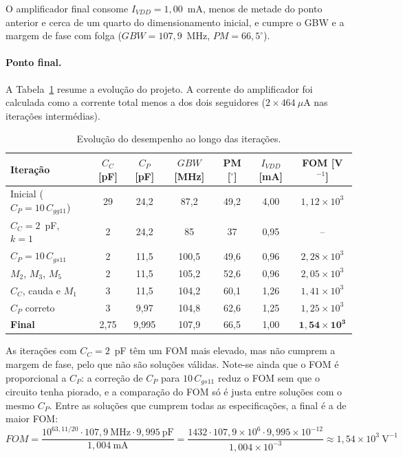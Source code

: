 O amplificador final consome $I_{VDD} = 1{,}00$~mA, menos de metade do ponto anterior e cerca de um quarto do
dimensionamento inicial, e cumpre o GBW e a margem de fase com folga ($GBW = 107{,}9$~MHz, $PM = 66{,}5^\circ$).

\paragraph{Ponto final.}
A Tabela~\ref{tab:iter_resumo} resume a evolução do projeto. A corrente do amplificador foi calculada como a corrente total
menos a dos dois seguidores ($2 \times 464~\mu$A nas iterações intermédias).

\begin{table}[H]
    \centering
    \caption{Evolução do desempenho ao longo das iterações.}
    \label{tab:iter_resumo}
    \small
    \begin{tabular}{lcccccc}
        \toprule
        Iteração & $C_C$ [pF] & $C_P$ [pF] & $GBW$ [MHz] & PM [$^\circ$] & $I_{VDD}$ [mA] & FOM [V$^{-1}$] \\
        \midrule
        Inicial ($C_P = 10\,C_{gg11}$)     & 29   & 24,2  & 87,2  & 49,2 & 4,00 & $1{,}12\times10^3$ \\
        $C_C = 2$~pF, $k = 1$              & 2    & 24,2  & 85    & 37   & 0,95 & -- \\
        $C_P = 10\,C_{gs11}$               & 2    & 11,5  & 100,5 & 49,6 & 0,96 & $2{,}28\times10^3$ \\
        $M_2$, $M_3$, $M_5$                & 2    & 11,5  & 105,2 & 52,6 & 0,96 & $2{,}05\times10^3$ \\
        $C_C$, cauda e $M_1$               & 3    & 11,5  & 104,2 & 60,1 & 1,26 & $1{,}41\times10^3$ \\
        $C_P$ correto                      & 3    & 9,97  & 104,8 & 62,6 & 1,25 & $1{,}25\times10^3$ \\
        \textbf{Final}                     & 2,75 & 9,995 & 107,9 & 66,5 & 1,00 & $\mathbf{1{,}54\times10^3}$ \\
        \bottomrule
    \end{tabular}
\end{table}

As iterações com $C_C = 2$~pF têm um FOM mais elevado, mas não cumprem a margem de fase, pelo que não são soluções
válidas. Note-se ainda que o FOM é proporcional a $C_P$: a correção de $C_P$ para $10\,C_{gs11}$ reduz o FOM sem que o
circuito tenha piorado, e a comparação do FOM só é justa entre soluções com o mesmo $C_P$. Entre as soluções que cumprem
todas as especificações, a final é a de maior FOM:
\begin{equation}
    FOM = \frac{10^{63{,}11/20}\cdot 107{,}9~\text{MHz}\cdot 9{,}995~\text{pF}}{1{,}004~\text{mA}}
    = \frac{1432 \cdot 107{,}9\times10^{6} \cdot 9{,}995\times10^{-12}}{1{,}004\times10^{-3}} \approx 1{,}54\times10^{3}~\text{V}^{-1}
\end{equation}

